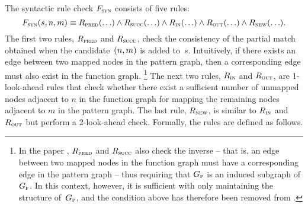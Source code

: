 The syntactic rule check $F_{\textrm{\textsc{syn}}}$ consists of five rules:
%
\begin{equation}
  F_{\textrm{\textsc{syn}}}(s, n, m) \equiv
  R_{\textrm{\textsc{pred}}}(\ldots) \wedge R_{\textrm{\textsc{succ}}}(\ldots) \wedge
  R_{\textrm{\textsc{in}}}(\ldots) \wedge R_{\textrm{\textsc{out}}}(\ldots) \wedge R_{\textrm{\textsc{new}}}(\ldots).
\end{equation}
%
The first two rules, $R_{\textrm{\textsc{pred}}}$ and $R_{\textrm{\textsc{succ}}}$, check the consistency
of the partial \gls{match} obtained when the candidate~\mbox{$\mPair{n}{m}$} is
added to~$s$.
%
Intuitively, if there exists an \gls{edge} between two mapped \glspl{node} in
the \gls{pattern graph}, then a corresponding \gls{edge} must also exist in the
\gls{function graph}.\!%
%
\footnote{%
  In the paper \cite{CordellaEtAl:2001}, $R_{\textrm{\textsc{pred}}}$ and $R_{\textrm{\textsc{succ}}}$
  also check the inverse -- that is, an \gls{edge} between two mapped
  \glspl{node} in the \gls{function graph} must have a corresponding \gls{edge}
  in the \gls{pattern graph} -- thus requiring that $G_{\textrm{\textsc{p}}}$ is an induced
  \gls{subgraph} of $G_{\textrm{\textsc{f}}}$.
  In this context, however, it is sufficient with only maintaining the structure
  of~$G_{\textrm{\textsc{p}}}$, and the condition above has therefore been removed from
  .
}
%
The next two rules, $R_{\textrm{\textsc{in}}}$ and $R_{\textrm{\textsc{out}}}$, are \num{1}-look-ahead
rules that check whether there exist a sufficient number of unmapped
\glspl{node} adjacent to $n$ in the \gls{function graph} for mapping the
remaining \glspl{node} adjacent to $m$ in the \gls{pattern graph}.
%
The last rule, $R_{\textrm{\textsc{new}}}$, is similar to $R_{\textrm{\textsc{in}}}$ and $R_{\textrm{\textsc{out}}}$
but perform a \num{2}-look-ahead check.
%
Formally, the rules are defined as follows.
%
